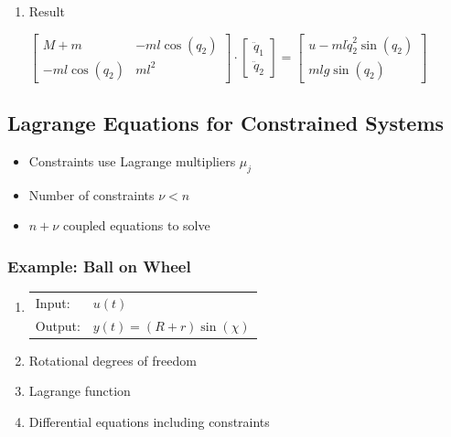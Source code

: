 \documentclass[10pt,a4paper]{scrartcl}
\begin{document}
\begin{multicols*}{3}
\begin{enumerate}
\item Result

$\begin{bmatrix}
M+m&-ml\cos(q_2)\\ -ml\cos(q_2)&ml^2
\end{bmatrix}\cdot\begin{bmatrix}
\ddot{q}_1\\ \ddot{q}_2
\end{bmatrix}=\begin{bmatrix}
u-ml\dot{q}_2^2\sin(q_2)\\mlg\sin(q_2)
\end{bmatrix}$
\end{enumerate}

\columnbreak

\subsection{Lagrange Equations for Constrained Systems}\label{lagrange+}


\begin{itemize}
\item Constraints use Lagrange multipliers $\mu_j$
\item Number of constraints $\nu<n$
\item $n+\nu$ coupled equations to solve
\end{itemize}

\subsubsection{Example: Ball on Wheel}


\begin{enumerate}
\item \begin{tabular}{ll}Input:&$u(t)$\\Output: &$y(t)=(R+r)\sin(\chi)$\end{tabular}

\item Rotational degrees of freedom
\item Lagrange function
\item Differential equations including constraints


\end{enumerate}
\end{multicols*}
\end{document}
